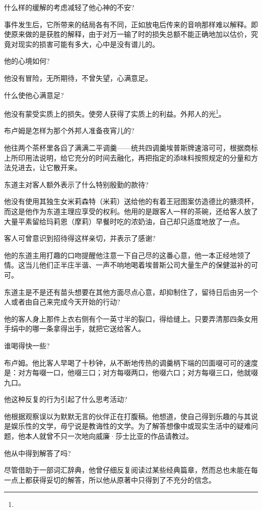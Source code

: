 \par 什么样的缓解的考虑减轻了他心神的不安?
\par 事件发生后，它所带来的结局各有不同，正如放电后传来的音响那样难以解释。即使原来做的是获胜的解释，由于对万一输了时的损失总额不能正确地加以估价，究竟对现实的损害可能有多大，心中是没有谱儿的。
\par 他的心境如何?
\par 他没有冒险，无所期待，不曾失望，心满意足。
\par 什么使他心满意足?
\par 他没有蒙受实质上的损失。使旁人获得了实质上的利益。外邦人的光\footnote{}。
\par 布卢姆是怎样为那个外邦人准备夜宵儿的?
\par 他往两个茶杯里各舀了满满二平调羹——统共四调羹埃普斯牌速溶可可，根据商标上所印用法说明，给它充分的时间去融化，再把指定的添味料按照规定的分量和方法兑进去，让它散开来。
\par 东道主对客人额外表示了什么特别殷勤的款待?
\par 他没有使用其独生女米莉森特（米莉）送给他的有着王冠图案仿造德比的搪须杯，而这是他作为东道主理应享受的权利。他用的是跟客人一样的茶碗，还给客人放了大量平素留给玛莉恩（摩莉）早餐时吃的浓奶油，自己却只适度地放了一点。
\par 客人可曾意识到招待得这样亲切，并表示了感谢?
\par 他的东道主用打趣的口吻提醒他注意一下自己尽的这番心意，他一本正经地领了情。这当儿他们正半庄半谐、一声不响地喝着埃普斯公司大量生产的保健滋补的可可。
\par 东道主是不是还有苗头想要在其他方面尽点心意，却抑制住了，留待日后由另一个人或者由自己来完成今天开始的行动?
\par 他的客人身上那件上衣右侧有个一英寸半的裂口，得给缝上。只要弄清那四条女用手绢中的哪一条拿得出手，就把它送给客人。
\par 谁喝得快一些?
\par 布卢姆。他比客人早喝了十秒钟，从不断地传热的调羹柄下端的凹面啜可可的速度是：对方每啜一口，他啜三口；对方每啜两口，他啜六口；对方每啜三口，他就啜九口。
\par 他这种反复的行为引起了什么思考活动?
\par 他根据观察误以为默默无言的伙伴正在打腹稿。他想道，使自己得到乐趣的与其说是娱乐性的文学，毋宁说是教诲性的文学。为了解答想像中或现实生活中的疑难问题，他本人就曾不只一次地向威廉·莎士比亚的作品请教过。
\par 他从中得到解答了吗?
\par 尽管借助于一部词汇辞典，他曾仔细反复阅读过某些经典篇章，然而总也未能在每一点上都获得妥切的解答，所以他从原著中只得到了不充分的信念。
